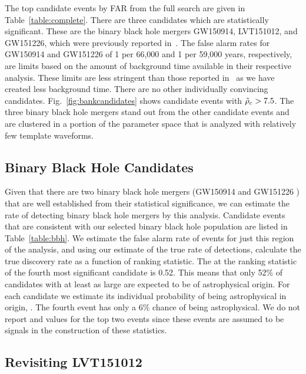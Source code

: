 The top candidate events by FAR from the full search are given in Table~\ref{table:complete}. There are three candidates which are statistically significant. These are the binary black hole mergers GW150914, LVT151012, and GW151226, which were previously reported in~\cite{TheLIGOScientific:2016pea,Abbott:2016blz,Abbott:2016nmj}. The false alarm rates for GW150914 and GW151226 of 1 per 66,000 and 1 per 59,000 years, respectively, are limits based on the amount of background time available in their respective analysis. These limits are less stringent than those reported in~\cite{TheLIGOScientific:2016pea} as we have created less background time. There are no other individually convincing candidates. Fig.~\ref{fig:bankcandidates} shows candidate events with $\tilde{\rho}_c > 7.5$. The three binary black hole mergers stand out from the other candidate events and are clustered in a portion of the parameter space that is analyzed with relatively few template waveforms.

\subsection{Binary Black Hole Candidates}

Given that there are two binary black hole mergers (GW150914 and GW151226 ) that are well established from their
statistical significance, we can estimate the rate of detecting binary black hole mergers by this analysis. Candidate
events that are consistent with our selected binary black hole population are listed in
Table~\ref{table:bbh}. We estimate the false alarm rate of events for just this region of the analysis, and using our
estimate of the true rate of detections, calculate the true discovery rate as a function of ranking statistic. The
\tdr{} at the ranking statistic of the fourth most significant candidate is 0.52. This means that only 52\% of
candidates with \rankingstat{} at least as large are expected to be of astrophysical origin. For each candidate we estimate its
individual probability of being astrophysical in origin, \pastro{}. The fourth event has only a 6$\%$ chance of being
astrophysical. We do not report \pastro{} and \tdr{} values for the top two events since these events
are assumed to be signals in the construction of these statistics.


\subsection{Revisiting LVT151012}

